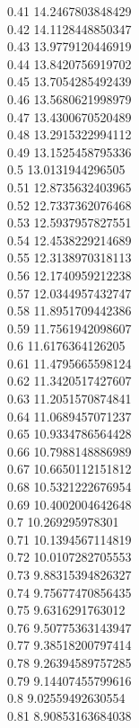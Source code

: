 {0.41	14.2467803848429\\
0.42	14.1128448850347\\
0.43	13.9779120446919\\
0.44	13.8420756919702\\
0.45	13.7054285492439\\
0.46	13.5680621998979\\
0.47	13.4300670520489\\
0.48	13.2915322994112\\
0.49	13.1525458795336\\
0.5	13.0131944296505\\
0.51	12.8735632403965\\
0.52	12.7337362076468\\
0.53	12.5937957827551\\
0.54	12.4538229214689\\
0.55	12.3138970318113\\
0.56	12.1740959212238\\
0.57	12.0344957432747\\
0.58	11.8951709442386\\
0.59	11.7561942098607\\
0.6	11.6176364126205\\
0.61	11.4795665598124\\
0.62	11.3420517427607\\
0.63	11.2051570874841\\
0.64	11.0689457071237\\
0.65	10.9334786564428\\
0.66	10.7988148886989\\
0.67	10.6650112151812\\
0.68	10.5321222676954\\
0.69	10.4002004642648\\
0.7	10.269295978301\\
0.71	10.1394567114819\\
0.72	10.0107282705553\\
0.73	9.88315394826327\\
0.74	9.75677470856435\\
0.75	9.6316291763012\\
0.76	9.50775363143947\\
0.77	9.38518200797414\\
0.78	9.26394589757285\\
0.79	9.14407455799616\\
0.8	9.02559492630554\\
0.81	8.90853163684038\\
}
